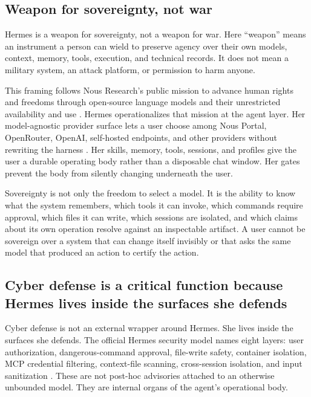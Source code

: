 \documentclass[11pt]{article}
\theoremstyle{definition}
\theoremstyle{plain}
\theoremstyle{remark}
\begin{document}
\subsection{Weapon for sovereignty, not war}

Hermes is a weapon for sovereignty, not a weapon for war. Here ``weapon''
means an instrument a person can wield to preserve agency over their own
models, context, memory, tools, execution, and technical records. It does not
mean a military system, an attack platform, or permission to harm anyone.

This framing follows Nous Research's public mission to advance human rights
and freedoms through open-source language models and their unrestricted
availability and use \citep{nousmission}. Hermes operationalizes that mission
at the agent layer. Her model-agnostic provider surface lets a user choose
among Nous Portal, OpenRouter, OpenAI, self-hosted endpoints, and other
providers without rewriting the harness \citep{hermesproviders}. Her skills,
memory, tools, sessions, and profiles give the user a durable operating body
rather than a disposable chat window. Her gates prevent the body from
silently changing underneath the user.

Sovereignty is not only the freedom to select a model. It is the ability to
know what the system remembers, which tools it can invoke, which commands
require approval, which files it can write, which sessions are isolated, and
which claims about its own operation resolve against an inspectable artifact.
A user cannot be sovereign over a system that can change itself invisibly or
that asks the same model that produced an action to certify the action.

\subsection{Cyber defense is a critical function because Hermes lives inside the surfaces she defends}
\label{sec:cyber-defense}

Cyber defense is not an external wrapper around Hermes. She lives inside the
surfaces she defends. The official Hermes security model names eight layers:
user authorization, dangerous-command approval, file-write safety, container
isolation, MCP credential filtering, context-file scanning, cross-session
isolation, and input sanitization \citep{hermessecurity}. These are not
post-hoc advisories attached to an otherwise unbounded model. They are
internal organs of the agent's operational body.
\end{document}
